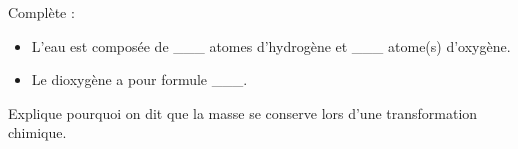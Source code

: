\documentclass[12pt]{article}
\begin{document}
\begin{exercice}{}{}
    Complète :
    \begin{itemize}
        \item L’eau est composée de \_\_\_ atomes d’hydrogène et \_\_\_ atome(s) d’oxygène.
        \item Le dioxygène a pour formule \_\_\_.
    \end{itemize}
\end{exercice}

\begin{exercice}{}{}
    Explique pourquoi on dit que la masse se conserve lors d’une transformation chimique.
\end{exercice}
\end{document}
